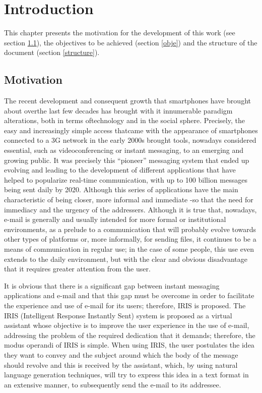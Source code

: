 \chapter{Introduction}
\label{cap:introduction}


This chapter presents the motivation for the development of this work (see section \ref{motivation}), the objectives to be achieved (section \ref{obje}) and the structure of the document (section \ref{structure}).

\section{Motivation}\label{motivation}
The recent development and consequent growth that smartphones have brought about overthe last few decades has brought with it innumerable paradigm alterations, both in terms oftechnology and in the social sphere. Precisely, the easy and increasingly simple access thatcame with the appearance of smartphones connected to a 3G network in the early 2000s brought tools, nowadays considered essential, such as videoconferencing or instant messaging, to an emerging and growing public. It was precisely this ``pioneer'' messaging system that ended up evolving and leading to the development of different applications that have helped to popularize real-time communication, with up to 100 billion messages being sent daily by 2020. Although this series of applications have the main characteristic of being closer, more informal and immediate -so that the need for immediacy and the urgency of the addressers. Although it is true that, nowadays, e-mail is generally and usually intended for more formal or institutional environments, as a prelude to a communication that will probably evolve towards other types of platforms or, more informally, for sending files, it continues to be a means of communication in regular use; in the case of some people, this use even extends to the daily environment, but with the clear and obvious disadvantage that it requires greater attention from the user.

It is obvious that there is a significant gap between instant messaging applications and e-mail and that this gap must be overcome in order to facilitate the experience and use of e-mail for its users; therefore, IRIS is proposed. The IRIS (Intelligent Response Instantly Sent) system is proposed as a virtual assistant whose objective is to improve the user experience in the use of e-mail, addressing the problem of the required dedication that it demands; therefore, the modus operandi of IRIS is simple. When using IRIS, the user postulates the idea they want to convey and the subject around which the body of the message should revolve and this is received by the assistant, which, by using natural language generation techniques, will try to express this idea in a text format in an extensive manner, to subsequently send the e-mail to its addressee.

